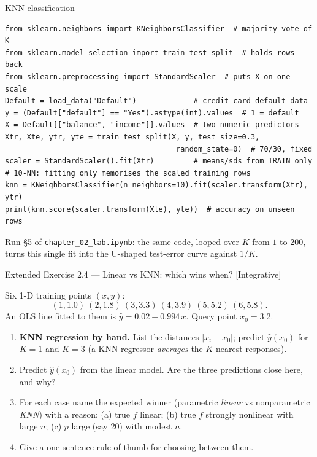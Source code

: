 \documentclass[aspectratio=169,11pt]{beamer}
\begin{document}
\begin{frame}[fragile]{KNN classification}
  \begin{lstlisting}
from sklearn.neighbors import KNeighborsClassifier  # majority vote of K
from sklearn.model_selection import train_test_split  # holds rows back
from sklearn.preprocessing import StandardScaler  # puts X on one scale
Default = load_data("Default")             # credit-card default data
y = (Default["default"] == "Yes").astype(int).values  # 1 = default
X = Default[["balance", "income"]].values  # two numeric predictors
Xtr, Xte, ytr, yte = train_test_split(X, y, test_size=0.3,
                                       random_state=0)  # 70/30, fixed
scaler = StandardScaler().fit(Xtr)         # means/sds from TRAIN only
# 10-NN: fitting only memorises the scaled training rows
knn = KNeighborsClassifier(n_neighbors=10).fit(scaler.transform(Xtr), ytr)
print(knn.score(scaler.transform(Xte), yte))  # accuracy on unseen rows
  \end{lstlisting}
  \begin{labnote}
    Run \S5 of \texttt{chapter\_02\_lab.ipynb}: the same code, looped over $K$ from $1$ to $200$,
    turns this single fit into the U-shaped test-error curve against $1/K$.
  \end{labnote}
\end{frame}



\begin{frame}{Extended Exercise 2.4 --- Linear vs KNN: which wins when? [Integrative]}
\begin{longexercise}
Six 1-D training points $(x,y)$:
\[
(1,1.0)\ (2,1.8)\ (3,3.3)\ (4,3.9)\ (5,5.2)\ (6,5.8).
\]
An OLS line fitted to them is $\hat y=0.02+0.994\,x$. Query point $x_0=3.2$.
\begin{enumerate}\setlength\itemsep{1pt}
  \item \textbf{KNN regression by hand.} List the distances $|x_i-x_0|$; predict $\hat y(x_0)$ for $K=1$ and $K=3$ (a KNN regressor \emph{averages} the $K$ nearest responses).
  \item Predict $\hat y(x_0)$ from the linear model. Are the three predictions close here, and why?
  \item For each case name the expected winner (parametric \emph{linear} vs nonparametric \emph{KNN}) with a reason: (a) true $f$ linear; (b) true $f$ strongly nonlinear with large $n$; (c) $p$ large (say $20$) with modest $n$.
  \item Give a one-sentence rule of thumb for choosing between them.
\end{enumerate}
\end{longexercise}
\end{frame}
\end{document}
